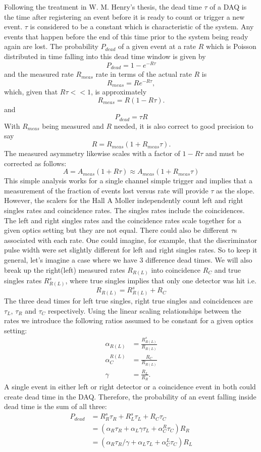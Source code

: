 \documentclass[12pt]{article}
\begin{document}
Following the treatment in W. M. Henry's thesis, the dead time $\tau$ of a DAQ is the time after registering an event before it is ready to count or trigger a new event. $\tau$ is considered to be a constant which is characteristic of the system. Any events that happen before the end of this time prior to the system being ready again are lost. The probability $P_{dead}$ of a given event at a rate $R$ which is Poisson distributed in time falling into this dead time window is given by
\[
P_{dead} = 1-e^{-R\tau}
\]
and the measured rate $R_{meas}$ rate  in terms of the actual rate $R$ is
\[
R_{meas}=Re^{-R\tau},
\]
which, given that $R\tau<<1$, is approximately
\[
R_{meas}=R(1-R\tau).
\]
and 
\begin{equation}
P_{dead}=\tau R
\label{eq:pdead}
\end{equation}
With $R_{meas}$ being measured and $R$ needed, it is also correct to good precision to say
\[
R=R_{meas}(1+R_{meas}\tau).
\]
The measured asymmetry likewise scales with a factor of $1-R\tau$ and must be corrected as follows:
\[A=A_{meas}(1+R\tau)\approx A_{meas}(1+R_{meas}\tau)
\]
This simple analysis works for a single channel simple trigger and implies that a measurement of the fraction of events lost versus rate will provide $\tau$ as the slope. However, the scalers for the Hall A Moller independently count left and right singles rates and coincidence rates. The singles rates include the coincidences. The left and right singles rates and the coincidence rates scale together for a given optics setting but they are not equal. There could also be different $\tau$s associated with each rate. One could imagine, for example, that the discriminator pulse width were set slightly different for left and right singles rates. So to keep it general, let's imagine a case where we have 3 difference dead times. We will also break up the right(left) measured rates $R_{R(L)}$ into coincidence $R_C$  and true singles rates $R^s_{R(L)}$, where true singles implies that only one detector was hit i.e.
\begin{equation}
R_{R(L)}=R^s_{R(L)}+R_C
\end{equation}
The three dead times for left true singles, right true singles and coincidences are $\tau_L$, $\tau_R$ and $\tau_C$ respectively. Using the linear scaling relationships between the rates we introduce the following ratios assumed to be constant for a given optics setting:
\begin{align}
\alpha_{R(L)}&=\frac{R^s_{R(L)}}{R_{R(L)}} \\
\alpha_C^{R(L)}&=\frac{R_C}{R_{R(L)}}\\
\gamma&=\frac{R_L}{R_R}.
\end{align} 
A single event in either left or right detector or a coincidence event in both could create dead time in the DAQ. Therefore, the probability of an event falling inside dead time is the sum of all three:
\begin{align}
P_{dead}&=R^s_R\tau_R+R^s_L\tau_L+R_C\tau_C\\
&=\left(\alpha_R\tau_R+\alpha_L\gamma\tau_L+\alpha_C^R\tau_C\right)R_R\\
&=\left(\alpha_R\tau_R/\gamma+\alpha_L\tau_L+\alpha^L_C\tau_C\right)R_L
\end{align}
\end{document}
